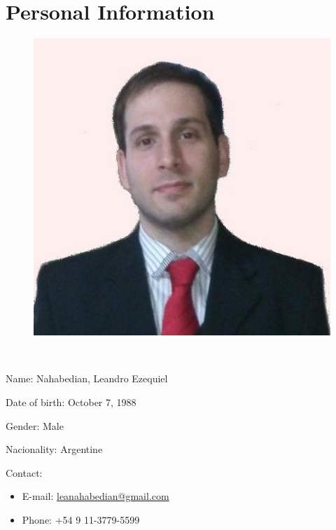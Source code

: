 \section{Personal Information}

\begin{figure}
\includegraphics[scale=0.25]{img/Lea}
\end{figure}

\ 

\begin{itemize}
\begin{normalsize}\normalsize \item  Name: Nahabedian, Leandro Ezequiel
\item Date of birth: October 7, 1988
\item Gender: Male
\item Nacionality: Argentine
\item Contact:
\end{normalsize}
\begin{itemize}
\item E-mail: \href{mailto:leanahabedian@gmail.com}{leanahabedian@gmail.com}
\item Phone: +54 9 11-3779-5599
\end{itemize} 
\end{itemize}

